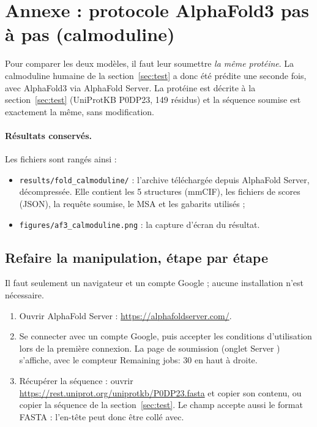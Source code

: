 \section{Annexe : protocole AlphaFold3 pas à pas (calmoduline)}
\label{annexe:protocole}

Pour comparer les deux modèles, il faut leur soumettre \emph{la même protéine}. La calmoduline humaine de la section~\ref{sec:test} a donc été prédite une seconde fois, avec AlphaFold3 via AlphaFold Server. La protéine est décrite à la section~\ref{sec:test} (UniProtKB P0DP23, 149 résidus) et la séquence soumise est exactement la même, sans modification.

\paragraph{Résultats conservés.} Les fichiers sont rangés ainsi :
\begin{itemize}
  \item \texttt{results/fold\_calmoduline/} : l'archive téléchargée depuis AlphaFold Server, décompressée. Elle contient les 5 structures (mmCIF), les fichiers de scores (JSON), la requête soumise, le MSA et les gabarits utilisés ;
  \item \texttt{figures/af3\_calmoduline.png} : la capture d'écran du résultat.
\end{itemize}

\subsection*{Refaire la manipulation, étape par étape}

Il faut seulement un navigateur et un compte Google ; aucune installation n'est nécessaire.
\begin{enumerate}
  \item Ouvrir AlphaFold Server : \url{https://alphafoldserver.com/}.
  \item Se connecter avec un compte Google, puis accepter les conditions d'utilisation lors de la première connexion. La page de soumission (onglet \og Server \fg{}) s'affiche, avec le compteur \og Remaining jobs: 30 \fg{} en haut à droite.
  \item Récupérer la séquence : ouvrir \url{https://rest.uniprot.org/uniprotkb/P0DP23.fasta} et copier son contenu, ou copier la séquence de la section~\ref{sec:test}. Le champ accepte aussi le format FASTA : l'en-tête peut donc être collé avec.
\end{enumerate}

